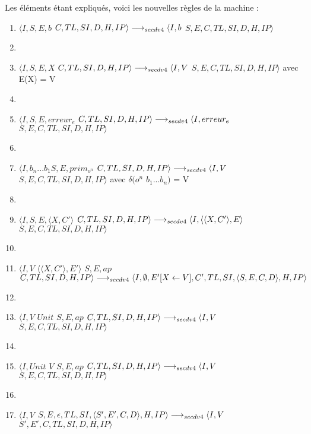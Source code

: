 \documentclass[10pt,a4paper]{article}
\begin{document}
			Les éléments étant expliqués, voici les nouvelles règles de la machine :
			\medbreak
			\begin{enumerate}
				\item $\langle I,S,E,b$ $C,TL,SI,D,H,IP\rangle 
				\\\longrightarrow_{secdv4} \langle I,b$ $S,E,C,TL,SI,D,H,IP\rangle$
				\item[]
				\item $\langle I,S,E,X$ $C,TL,SI,D,H,IP\rangle
				\\\longrightarrow_{secdv4} \langle I,V$ $S,E,C,TL,SI,D,H,IP\rangle$ avec E(X) = V
				\item[]
				\item $\langle I,S,E,erreur_{e}$ $C,TL,SI,D,H,IP\rangle
				\\ \longrightarrow_{secdv4} \langle I,erreur_{e}$ $S,E,C,TL,SI,D,H,IP\rangle$
				\item[]
				\item $\langle I,b_{n}...b_{1}S,E,prim_{o^{n}}$ $C,TL,SI,D,H,IP\rangle
				\\ \longrightarrow_{secdv4} \langle I,V$ $S,E,C,TL,SI,D,H,IP\rangle$ avec $\delta(o^{n}$ $b_{1}...b_{n})$ = V
				\item[]
				\item $\langle I,S,E,\langle X,C'\rangle$ $C,TL,SI,D,H,IP\rangle
				\\ \longrightarrow_{secdv4} \langle I,\langle\langle X,C'\rangle,E\rangle$ $S,E,C,TL,SI,D,H,IP\rangle$
				\item[]
				\item $\langle I,V$ $\langle\langle X,C'\rangle,E'\rangle$ $S,E,ap$ $C,TL,SI,D,H,IP\rangle
				\\ \longrightarrow_{secdv4} \langle I,\emptyset,E'[X \leftarrow V],C',TL,SI,\langle S,E,C,D\rangle,H,IP\rangle$
				\item[]
				\item $\langle I,V$ $Unit$ $S,E,ap$ $C,TL,SI,D,H,IP\rangle
				\\ \longrightarrow_{secdv4} \langle I,V$ $S,E,C,TL,SI,D,H,IP\rangle$
				\item[]
				\item $\langle I,Unit$ $V$ $S,E,ap$ $C,TL,SI,D,H,IP\rangle
				\\ \longrightarrow_{secdv4} \langle I,V$ $S,E,C,TL,SI,D,H,IP\rangle$
				\item[]
				\item $\langle I,V$ $S,E,\epsilon,TL,SI,\langle S',E',C,D\rangle,H,IP\rangle
				\\ \longrightarrow_{secdv4} \langle I,V$ $S',E',C,TL,SI,D,H,IP\rangle$

\end{enumerate}
\end{document}
